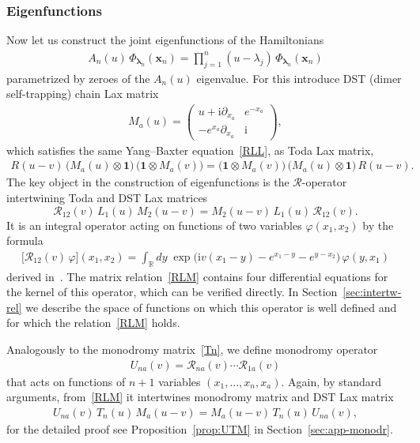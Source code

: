 \documentclass[11pt]{article}
\numberwithin{equation}{section}
\theoremstyle{plain}
\theoremstyle{definition}
\newcommand{\MO}{U}
\renewcommand{\phi}{\varphi}
\renewcommand{\imath}{\mathrm{i}}
\begin{document}
\subsubsection{Eigenfunctions} \label{sec:int-gl-eigen}

Now let us construct the joint eigenfunctions of the Hamiltonians
\begin{align} \label{A-eigen}
	A_n(u) \, \Phi_{\bm{\lambda}_n}(\bm{x}_n) = \prod_{j = 1}^n (u - \lambda_j) \, \Phi_{\bm{\lambda}_n}(\bm{x}_n)
\end{align}
parametrized by zeroes of the $A_n(u)$ eigenvalue. For this introduce DST (dimer self-trapping) chain Lax matrix~\cite{KSS}
\begin{align} \label{DST-M}
	M_a(u) = 
	\begin{pmatrix}
		u + \imath \partial_{x_a} & e^{-x_a} \\[4pt]
		-e^{x_a} \partial_{x_a} & \imath
	\end{pmatrix},
\end{align}
which satisfies the same Yang--Baxter equation~\eqref{RLL}, as Toda Lax matrix,
\begin{align} \label{DST-YB}
	R(u - v) \, \bigl( M_a(u) \otimes \bm{1} \bigr) \, \bigl( \bm{1} \otimes M_a(v) \bigr) = \bigl( \bm{1} \otimes M_a(v) \bigr) \,  \bigl( M_a(u) \otimes \bm{1} \bigr) \, R(u - v).
\end{align}
The key object in the construction of eigenfunctions is the $\mathcal{R}$-operator intertwining Toda and DST Lax matrices
\begin{equation}\label{RLM}
	\mathcal{R}_{12}(v) \, L_1(u) \, M_2(u - v) = M_2(u - v) \, L_1(u) \, \mathcal{R}_{12}( v).
\end{equation}
It is an integral operator acting on functions of two variables $\phi(x_1, x_2)$ by the formula
\begin{align}\label{R}
	\bigl[ \mathcal{R}_{12} (v)\, \phi \bigr](x_1, x_2) = \int_{\mathbb{R}} dy \; \exp \bigl( \imath v(x_1 - y) - e^{x_1 - y} - e^{y - x_2} \bigr) \, \phi(y, x_1)
\end{align}
derived in~\cite[Section 3.4]{Skl2}. The matrix relation~\eqref{RLM} contains four differential equations for the kernel of this operator, which can be verified directly. In Section~\ref{sec:intertw-rel} we describe the space of functions on which this operator is well defined and for which the relation~\eqref{RLM} holds.

Analogously to the monodromy matrix~\eqref{Tn}, we define monodromy operator
\begin{align}\label{mon-op}
	\MO_{na}(v) = \mathcal{R}_{na}(v) \cdots \mathcal{R}_{1a}(v)
\end{align}
that acts on functions of $n + 1$ variables $(x_1,\ldots,x_n,x_a)$. Again, by standard arguments, from~\eqref{RLM} it intertwines monodromy matrix and DST Lax matrix
\begin{align}\label{UTM}
	U_{na}(v) \, T_n(u) \, M_{a}(u - v) = M_a(u - v) \, T_n(u) \, U_{na}(v),
\end{align}
for the detailed proof see Proposition~\ref{prop:UTM} in Section~\ref{sec:app-monodr}. 
\end{document}
